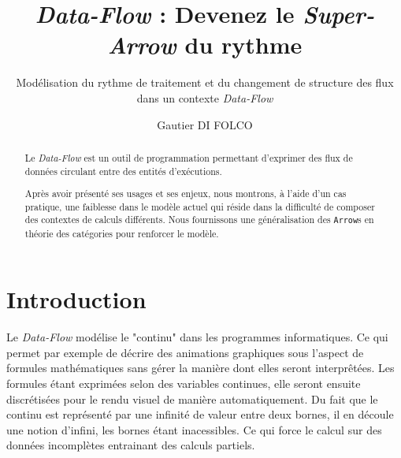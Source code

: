 \documentclass{llncs}
\newcommand{\DF}{\emph{Data-Flow} }
\newcommand{\SA}{\emph{Super-Arrow} }
\newcommand{\Arrs}{\lstinline{Arrow}s }
\begin{document}
\title{\DF : Devenez le \SA du rythme}


\subtitle{Modélisation du rythme de traitement et du changement de structure des flux dans un contexte \DF}


\author{Gautier DI FOLCO}







\maketitle

\begin{abstract}
Le \DF est un outil de programmation permettant d'exprimer des flux de
données circulant entre des entités d'exécutions.

Après avoir présenté ses usages et ses enjeux, nous montrons, à l'aide d'un
cas pratique, une faiblesse dans le modèle actuel qui réside dans la difficulté
de composer des contextes de calculs différents.
Nous fournissons une généralisation des \Arrs en théorie des catégories pour
renforcer le modèle.
\end{abstract}

\section{Introduction}
Le \DF modélise le "continu" dans les programmes informatiques.
Ce qui permet par exemple de décrire des animations graphiques sous l'aspect de
formules mathématiques sans gérer la manière dont elles seront interprêtées.
Les formules étant exprimées selon des variables continues, elle seront ensuite
discrétisées pour le rendu visuel de manière automatiquement.
Du fait que le continu est représenté par une infinité de valeur entre deux bornes,
il en découle une notion d'infini, les bornes étant inacessibles.
Ce qui force le calcul sur des données incomplètes entrainant des calculs partiels.
\end{document}
